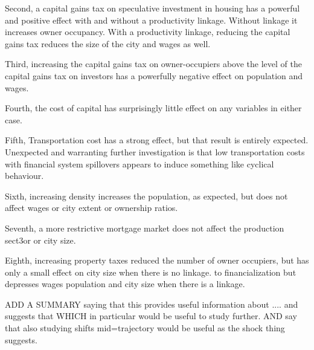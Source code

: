 Second, a capital gains tax on speculative investment in housing has a powerful and positive effect with and without a productivity linkage. Without linkage it increases owner occupancy. With a productivity linkage, reducing the capital gains tax reduces the size of the city and wages as well. 

Third, increasing the capital gains tax on owner-occupiers above the level of the capital gains tax on investors has a powerfully negative effect on population and wages.

Fourth, the cost of capital has surprisingly little effect on any variables in either case.

Fifth, Transportation cost has a strong effect, but that result is entirely expected. Unexpected and warranting further investigation is that low transportation costs with financial system spillovers appears to induce something like cyclical behaviour.

Sixth, increasing density increases the population, as expected, but does not affect wages or city extent 
{\color{red} or ownership ratios.}

Seventh, a more restrictive mortgage market does not affect the production sect3or or city size.

Eighth, increasing property taxes reduced the number of owner occupiers, but has only a small effect on city size when there is no linkage. to financialization but depresses wages population and city size when there is a linkage. 


{\color{red} ADD A SUMMARY saying that this provides useful information about .... and suggests that WHICH in particular would be useful to study further. AND say that also studying shifts mid=trajectory would be useful as the shock thing suggests.}



